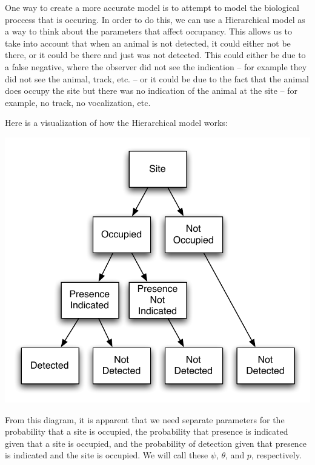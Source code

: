 \documentclass[12pt]{article}
\begin{document}
    One way to create a more accurate model is to attempt to model the biological 
proccess that is occuring.  In order to do this, we can use a Hierarchical model as a
    way to think about the parameters that affect occupancy. This allows us to
    take into account that when an animal is not detected, it could either not
    be there, or it could be there and just was not detected. This could either
    be due to a false negative, where the observer did not see the indication --
    for example they did not see the animal, track, etc. -- or it could be due
    to the fact that the animal does occupy the site but there was no indication
    of the animal at the site -- for example, no track, no vocalization, etc.

    Here is a visualization of how the Hierarchical model works:

    \begin{center}
        \includegraphics[scale=0.75]{SimpleHierarchicalModel}
    \end{center}

    From this diagram, it is apparent that we need separate parameters for the
    probability that a site is occupied, the probability that presence is
    indicated given that a site is occupied, and the probability of detection
    given that presence is indicated and the site is occupied. We will call
    these \(\psi\), \(\theta\), and \(p\), respectively.
\end{document}
